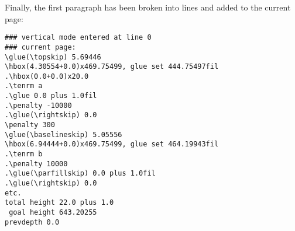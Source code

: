 \documentclass{book}
\begin{document}
Finally, the first paragraph has been broken into lines and 
added to the current page:\begin{verbatim}
### vertical mode entered at line 0
### current page:
\glue(\topskip) 5.69446
\hbox(4.30554+0.0)x469.75499, glue set 444.75497fil
.\hbox(0.0+0.0)x20.0
.\tenrm a
.\glue 0.0 plus 1.0fil
.\penalty -10000
.\glue(\rightskip) 0.0
\penalty 300
\glue(\baselineskip) 5.05556
\hbox(6.94444+0.0)x469.75499, glue set 464.19943fil
.\tenrm b
.\penalty 10000
.\glue(\parfillskip) 0.0 plus 1.0fil
.\glue(\rightskip) 0.0
etc.
total height 22.0 plus 1.0
 goal height 643.20255
prevdepth 0.0
\end{verbatim}


\endofchapter
\end{document}
